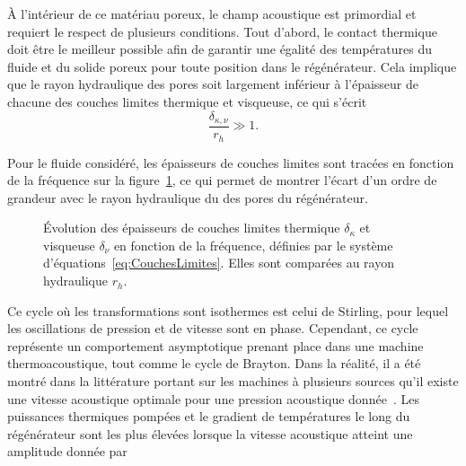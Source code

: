 \medskip

À l'intérieur de ce matériau poreux, le champ acoustique est primordial et requiert le respect de plusieurs conditions. Tout d'abord, le contact thermique doit être le meilleur possible afin de garantir une égalité des températures du fluide et du solide poreux pour toute position dans le régénérateur. Cela implique que le rayon hydraulique des pores soit largement inférieur à l'épaisseur de chacune des couches limites thermique et visqueuse, ce qui s'écrit
\begin{equation}
	\frac{\delta_{\kappa,\nu}}{r_h} \gg 1.
	\label{eq:ConditionIso_dkdv}
\end{equation}

Pour le fluide considéré, les épaisseurs de couches limites sont tracées en fonction de la fréquence sur la figure~\ref{fig:dKdV}, ce qui permet de montrer l'écart d'un ordre de grandeur avec le rayon hydraulique du des pores du régénérateur.

\begin{figure}[!ht]
    \centering
    
    \caption{\'Evolution des épaisseurs de couches limites thermique $\delta_\kappa$ et visqueuse $\delta_\nu$ en fonction de la fréquence, définies par le système d'équations~\eqref{eq:CouchesLimites}. Elles sont comparées au rayon hydraulique $r_h$.}
    \label{fig:dKdV}
\end{figure}

Ce cycle où les transformations sont isothermes est celui de Stirling, pour lequel les oscillations de pression et de vitesse sont en phase. Cependant, ce cycle représente un comportement asymptotique prenant place dans une machine thermoacoustique, tout comme le cycle de Brayton. Dans la réalité, il a été montré dans la littérature portant sur les machines à plusieurs sources qu'il existe une vitesse acoustique optimale pour une pression acoustique donnée~\cite{poignand_analysis_2013, poignand_etude_2006, poignand_optimal_2007, poignand_thermoacoustic_2011}. Les puissances thermiques pompées et le gradient de températures le long du régénérateur sont les plus élevées lorsque la vitesse acoustique atteint une amplitude donnée par

